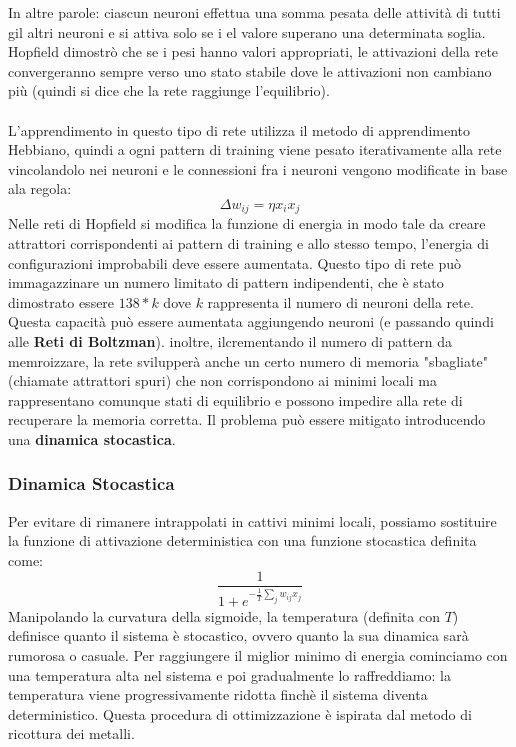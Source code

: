 \documentclass[12pt, a4paper]{article}
\begin{document}
In altre parole: ciascun neuroni effettua una somma pesata delle attività di tutti gil altri neuroni e si attiva solo se i el valore superano una determinata soglia.\\
Hopfield dimostrò che se i pesi hanno valori appropriati, le attivazioni della rete convergeranno sempre verso uno stato stabile dove le attivazioni non cambiano più (quindi si dice che la rete raggiunge l'equilibrio).\\
\\
L'apprendimento in questo tipo di rete utilizza il metodo di apprendimento Hebbiano, quindi a ogni pattern di training viene pesato iterativamente alla rete vincolandolo nei neuroni e le connessioni fra i neuroni vengono modificate in base ala regola:
\[\Delta w_{ij}=\eta x_ix_j\]
Nelle reti di Hopfield si modifica la funzione di energia in modo tale da creare attrattori corrispondenti ai pattern di training e allo stesso tempo, l'energia di configurazioni improbabili deve essere aumentata.
Questo tipo di rete può immagazzinare un numero limitato di pattern indipendenti, che è stato dimostrato essere \(138*k\) dove \(k\) rappresenta il numero di neuroni della rete. Questa capacità può essere aumentata aggiungendo neuroni (e passando quindi alle \textbf{Reti di Boltzman}). inoltre, ilcrementando il numero di pattern da memroizzare, la rete svilupperà anche un certo numero di memoria "sbagliate" (chiamate attrattori spuri) che non corrispondono ai minimi locali ma rappresentano comunque stati di equilibrio e possono impedire alla rete di recuperare la memoria corretta. Il problema può essere mitigato introducendo una \textbf{dinamica stocastica}.\\

\subsubsection{Dinamica Stocastica}
Per evitare di rimanere intrappolati in cattivi minimi locali, possiamo sostituire la funzione di attivazione deterministica con una funzione stocastica definita come:
\[\frac{1}{1+e^{-\frac{1}{T} \sum_j w_{ij}x_j}}\]
Manipolando la curvatura della sigmoide, la temperatura (definita con \(T\)) definisce quanto il sistema è stocastico, ovvero quanto la sua dinamica sarà rumorosa o casuale.
Per raggiungere il miglior minimo di energia cominciamo con una temperatura alta nel sistema e poi gradualmente lo raffreddiamo: la temperatura viene progressivamente ridotta finchè il sistema diventa deterministico. Questa procedura di ottimizzazione è ispirata dal metodo di ricottura dei metalli. 
\end{document}
